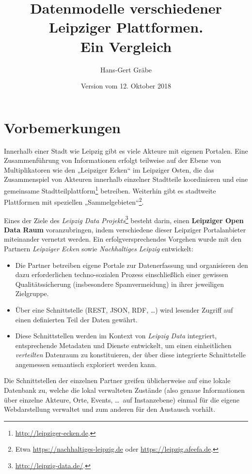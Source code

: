 \documentclass[a4paper,11pt]{article}
\title{Datenmodelle verschiedener Leipziger Plattformen.\\ Ein Vergleich}
\author{Hans-Gert Gräbe}
\date{Version vom 12. Oktober 2018}
\begin{document}
\maketitle
\tableofcontents 
\newpage

\section{Vorbemerkungen}

Innerhalb einer Stadt wie Leipzig gibt es viele Akteure mit eigenen Portalen.
Eine Zusammenführung von Informationen erfolgt teilweise auf der Ebene von
Multiplikatoren wie den „Leipziger Ecken“ im Leipziger Osten, die das
Zusammenspiel von Akteuren innerhalb einzelner Stadtteile koordinieren und
eine gemeinsame Stadtteilplattform\footnote{\url{http://leipziger-ecken.de}.}
betreiben.  Weiterhin gibt es stadtweite Plattformen mit speziellen
„Sammelgebieten“\footnote{Etwa \url{https://nachhaltiges-leipzig.de} oder
\url{https://leipzig.afeefa.de}.}.

Eines der Ziele des \emph{Leipzig Data
  Projekts}\footnote{\url{http://leipzig-data.de/}.} besteht darin, einen
\textbf{Leipziger Open Data Raum} voranzubringen, indem verschiedene dieser
Leipziger Portalanbieter miteinander vernetzt werden. Ein erfolgversprechendes
Vorgehen wurde mit den Partnern \emph{Leipziger Ecken} sowie
\emph{Nachhaltiges Leipzig} entwickelt:
\begin{itemize}
\item [1)] Die Partner betreiben eigene Portale zur Datenerfassung und
  organisieren den dazu erforderlichen techno-sozialen Prozess einschließlich
  einer gewissen Qualitätssicherung (insbesondere Spamvermeidung) in ihrer
  jeweiligen Zielgruppe. 
\item [2)] Über eine Schnittstelle (REST, JSON, RDF, \ldots) wird lesender
  Zugriff auf einen definierten Teil der Daten gewährt.
\item [3)] Diese Schnittstellen werden im Kontext von \emph{Leipzig Data}
  integriert, entsprechende Metadaten und Dienste entwickelt, um einen
  einheitlichen \emph{verteilten} Datenraum zu konstituieren, der über diese
  integrierte Schnittstelle angemessen semantisch exploriert werden kann. 
\end{itemize}
Die Schnittstellen der einzelnen Partner greifen üblicherweise auf eine lokale
Datenbank zu, welche die lokal verwalteten Zustände (also genaue Informationen
über einzelne Akteure, Orte, Events, \ldots\ auf Instanzebene) einmal für die
eigene Webdarstellung verwaltet und zum anderen für den Austausch vorhält. 
\end{document}
